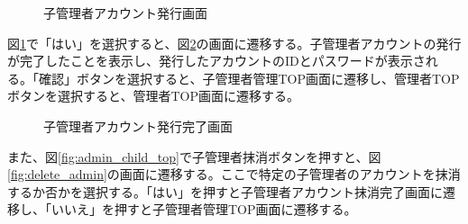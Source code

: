 \documentclass[a4j]{jarticle}
\begin{document}
\begin{figure}[H]
\centering
{}
\caption{子管理者アカウント発行画面}
\label{fig:create_admin}
\end{figure}
図\ref{fig:create_admin}で「はい」を選択すると、図\ref{fig:new_admin}の画面に遷移する。子管理者アカウントの発行が完了したことを表示し、発行したアカウントのIDとパスワードが表示される。「確認」ボタンを選択すると、子管理者管理TOP画面に遷移し、管理者TOPボタンを選択すると、管理者TOP画面に遷移する。
\begin{figure}[H]
\centering
{}
\caption{子管理者アカウント発行完了画面}
\label{fig:new_admin}
\end{figure}
また、図\ref{fig:admin_child_top}で子管理者抹消ボタンを押すと、図\ref{fig:delete_admin}の画面に遷移する。ここで特定の子管理者のアカウントを抹消するか否かを選択する。「はい」を押すと子管理者アカウント抹消完了画面に遷移し、「いいえ」を押すと子管理者管理TOP画面に遷移する。
\end{document}
